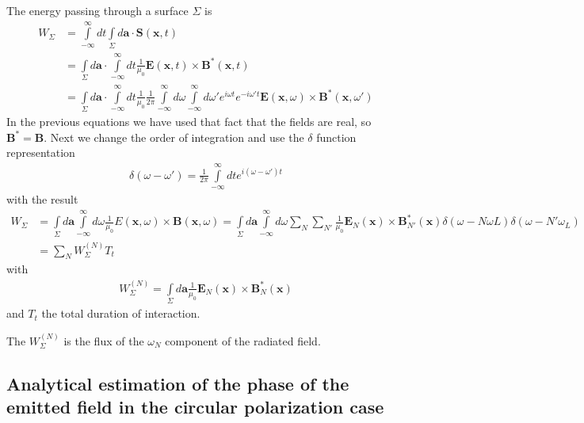   The  energy passing through a surface $\Sigma$ is
  \begin{align}
    W_{\Sigma} & =\int\limits_{-\infty}^\infty dt \int\limits_\Sigma d{\bm a}\cdot{\bm S}({\bm x},t)\nonumber                                                                                                                                                                \\
    & = \int\limits_\Sigma d{\bm a}\cdot\int\limits_{-\infty}^\infty dt\frac1{\mu_0}{\bm E({\bm x},t)}\times{\bm B}^*({\bm x},t)\nonumber                                                                                                                         \\
    & = \int\limits_\Sigma d{\bm a}\cdot\int\limits_{-\infty}^\infty dt\frac1{\mu_0}\frac1{2\pi}\int \limits_{-\infty}^\infty d\omega \int \limits_{-\infty}^\infty d\omega' e^{i\omega t} e^{-i\omega' t}{\bm E({\bm x},\omega)}\times{\bm B}^*({\bm x},\omega')
  \end{align}
  In the previous equations we have used that fact that the fields are real, so ${\bm B}^*={\bm B}$. Next we change the order of integration and use the $\delta$ function representation
  \begin{align}
    \delta(\omega-\omega')=\frac1{2\pi}\int\limits_{-\infty}^{\infty} dt e^{i(\omega-\omega')t}
  \end{align}
  with the result
  \begin{align}
    W_{\Sigma} & =\int\limits_{\Sigma} d{\bm a}\int\limits_{-\infty}^{\infty} d\omega \frac1{\mu_0}E({\bm x},\omega)\times{\bm B}({\bm x},\omega)=\int\limits_{\Sigma} d{\bm a}\int\limits_{-\infty}^{\infty} d\omega \sum\limits_{N}\sum\limits_{N'}\frac1{\mu_0}{\bm E}_N({\bm x})\times{\bm B}^*_{N'}({\bm x})\delta(\omega-N\omega L)\delta(\omega-N'\omega_L)\nonumber \\
    & =\sum\limits_N W^{(N)}_{\Sigma} T_t
  \end{align}
  with
  \begin{align}
    W^{(N)}_\Sigma = \int\limits_{\Sigma} d{\bm a}\frac1{\mu_0} {\bm E}_N({\bm x})\times{\bm B}^*_N({\bm x})
  \end{align}
  and $T_t$ the total duration of interaction.

  The $W^{(N)}_\Sigma$ is the flux of the $\omega_N$ component of the radiated field.

  \subsection{Analytical estimation of the phase of the emitted field in the circular polarization case}

